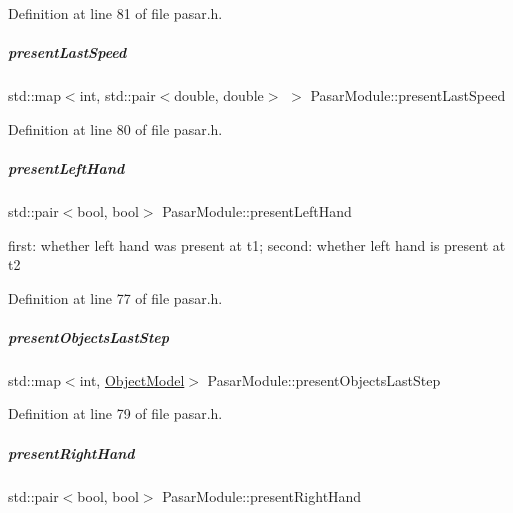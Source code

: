 Definition at line 81 of file pasar.\+h.

\mbox{\label{group__pasar_a28ae26a5986426c363c29a43cc63a473}} 
\subparagraph{\texorpdfstring{present\+Last\+Speed}{presentLastSpeed}}
{\footnotesize\ttfamily std\+::map$<$int, std\+::pair$<$double, double$>$ $>$ Pasar\+Module\+::present\+Last\+Speed\hspace{0.3cm}{\ttfamily [protected]}}



Definition at line 80 of file pasar.\+h.

\mbox{\label{group__pasar_a30c0a497ae076d531d86361a8ba906fa}} 
\subparagraph{\texorpdfstring{present\+Left\+Hand}{presentLeftHand}}
{\footnotesize\ttfamily std\+::pair$<$bool, bool$>$ Pasar\+Module\+::present\+Left\+Hand\hspace{0.3cm}{\ttfamily [protected]}}



first\+: whether left hand was present at t1; second\+: whether left hand is present at t2 



Definition at line 77 of file pasar.\+h.

\mbox{\label{group__pasar_ab0c3a82aef0ace07c7c704c58ffc6394}} 
\subparagraph{\texorpdfstring{present\+Objects\+Last\+Step}{presentObjectsLastStep}}
{\footnotesize\ttfamily std\+::map$<$int, \hyperlink{group__pasar_structObjectModel}{Object\+Model}$>$ Pasar\+Module\+::present\+Objects\+Last\+Step\hspace{0.3cm}{\ttfamily [protected]}}



Definition at line 79 of file pasar.\+h.

\mbox{\label{group__pasar_a5bdd7a086325ec7bc41f71579c922212}} 
\subparagraph{\texorpdfstring{present\+Right\+Hand}{presentRightHand}}
{\footnotesize\ttfamily std\+::pair$<$bool, bool$>$ Pasar\+Module\+::present\+Right\+Hand\hspace{0.3cm}{\ttfamily [protected]}}



